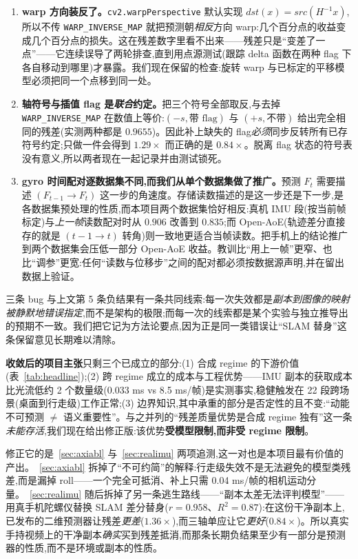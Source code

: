 \documentclass[UTF8,12pt,a4paper]{ctexart}
\begin{document}
\begin{enumerate}
  \item \textbf{warp 方向装反了。}\texttt{cv2.warpPerspective} 默认实现 $dst(x) = src(H^{-1}x)$,所以不传 \texttt{WARP\_INVERSE\_MAP} 就把预测朝\emph{相反}方向 warp:几个百分点的收益变成几个百分点的损失。这在残差数字里看不出来——残差只是``变差了一点''——它连续误导了两轮排查,直到用点源测试(跟踪 delta 函数在两种 flag 下各自移动到哪里)才暴露。我们现在保留的检查:旋转 warp 与已标定的平移模型必须把同一个点移到同一处。
  \item \textbf{轴符号与插值 flag 是\emph{联合}约定。}把三个符号全部取反,与去掉 \texttt{WARP\_INVERSE\_MAP} 在数值上等价:$(-s, \text{带 flag})$ 与 $(+s, \text{不带})$ 给出完全相同的残差(实测两种都是 $0.9655$)。因此补上缺失的 flag\emph{必须}同步反转所有已存符号约定;只做一件会得到 $1.29\times$ 而正确的是 $0.84\times$。脱离 flag 状态的符号表没有意义,所以两者现在一起记录并由测试锁死。
  \item \textbf{gyro 时间配对逐数据集不同,而我们从单个数据集做了推广。}预测 $F_t$ 需要描述 $(F_{t-1} \to F_t)$ 这一步的角速度。存储读数描述的是这一步还是下一步,是各数据集预处理的性质,而本项目两个数据集恰好相反:真机 IMU 段(按当前帧标定)与\emph{上一帧}读数配对时从 $0.906$ 改善到 $0.835$;而 Open-AoE(轨迹差分直接存的就是 $(t{-}1 \to t)$ 转角)则一致地更适合当帧读数。把手机上的结论推广到两个数据集会压低一部分 Open-AoE 收益。教训比``用上一帧''更窄、也比``调参''更宽:任何``读数与位移步''之间的配对都必须按数据源声明,并在留出数据上验证。
\end{enumerate}

三条 bug 与上文第 5 条负结果有一条共同线索:每一次失效都是\emph{副本到图像的映射被静默地错误指定},而不是架构的极限;而每一次的线索都是某个实验与独立推导出的预期不一致。我们把它记为方法论要点,因为正是同一类错误让``SLAM 替身''这条保留意见长期难以清除。

\textbf{收敛后的项目主张}只剩三个已成立的部分:(1) 合成 regime 的下游价值(表~\ref{tab:headline});(2) 跨 regime 成立的成本与工程优势——IMU 副本的获取成本比光流低约 2 个数量级(0.033 ms vs 8.5 ms/帧)是实测事实,稳健触发在 22 段跨场景(桌面到行走级)工作正常;(3) 边界知识,其中承重的部分是否定性的且不变:``动能不可预测 $\ne$ 语义重要性''。与之并列的``残差质量优势是合成 regime 独有''这一条\emph{未能存活},我们现在给出修正版:该优势\textbf{受模型限制,而非受 regime 限制}。

修正它的是~\ref{sec:axiabl} 与~\ref{sec:realimu} 两项追测,这一对也是本项目最有价值的产出。~\ref{sec:axiabl} 拆掉了``不可约简''的解释:行走级失效不是无法避免的模型类残差,而是漏掉 roll——一个完全可抵消、补上只需 0.04 ms/帧的相机运动分量。~\ref{sec:realimu} 随后拆掉了另一条逃生路线——``副本太差无法评判模型''——用真手机陀螺仪替换 SLAM 差分替身($r{=}0.958$、$R^2{=}0.87$):在这份干净副本上,已发布的二维预测器让残差\emph{更差}($1.36\times$),而三轴单应让它\emph{更好}($0.84\times$)。所以真实手持视频上的干净副本\emph{确实}买到残差抵消,而那条长期负结果至少有一部分是预测器的性质,而不是环境或副本的性质。
\end{document}
